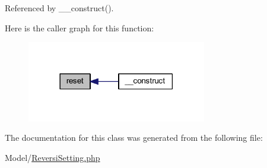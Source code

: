 Referenced by \+\_\+\+\_\+construct().

Here is the caller graph for this function\+:
\nopagebreak
\begin{figure}[H]
\begin{center}
\leavevmode
\includegraphics[width=222pt]{class_reversi_setting_a4a20559544fdf4dcb457e258dc976cf8_icgraph}
\end{center}
\end{figure}


The documentation for this class was generated from the following file\+:\begin{DoxyCompactItemize}
\item 
Model/\hyperlink{_reversi_setting_8php}{Reversi\+Setting.\+php}\end{DoxyCompactItemize}
